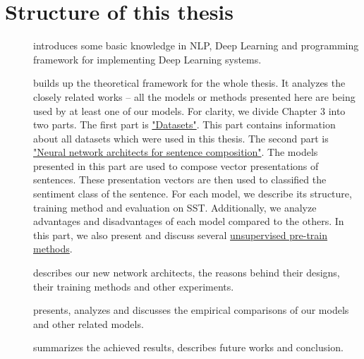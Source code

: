\section{Structure of this thesis}
\begin{description}
\item [] introduces some basic knowledge in NLP, Deep Learning and programming framework for implementing Deep Learning systems. 
\item [] builds up the theoretical framework for the whole thesis. 
It analyzes the closely related works -- all the models or methods presented here are being used by at least one of our models.
For clarity, we divide Chapter 3 into two parts.
The first part is \hyperref[sec:dataset]{"Datasets"}. 
This part contains information about all datasets which were used in this thesis.
The second part is \hyperref[sec:composer]{"Neural network architects for sentence composition"}.
The models presented in this part are used to compose vector presentations of sentences.
These presentation vectors are then used to classified the sentiment class of the sentence.
For each model, we describe its structure, training method and evaluation on SST.
Additionally, we analyze advantages and disadvantages of each model compared to the others.
In this part, we also present and discuss several \hyperref[sec:unsupervised-pretrain]{unsupervised pre-train methods}.
\item [] describes our new network architects, the reasons behind their designs, their training methods and other experiments. 
\item [] presents, analyzes and discusses the empirical comparisons of our models and other related models.
\item [] summarizes the achieved results, describes future works and conclusion.
\end{description}